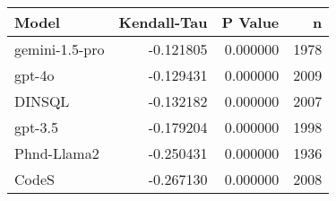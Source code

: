 \begin{tabular}{lrrr}
\toprule
Model & Kendall-Tau & P Value & n \\
\midrule
gemini-1.5-pro & -0.121805 & 0.000000 & 1978 \\
gpt-4o & -0.129431 & 0.000000 & 2009 \\
DINSQL & -0.132182 & 0.000000 & 2007 \\
gpt-3.5 & -0.179204 & 0.000000 & 1998 \\
Phnd-Llama2 & -0.250431 & 0.000000 & 1936 \\
CodeS & -0.267130 & 0.000000 & 2008 \\
\bottomrule
\end{tabular}

